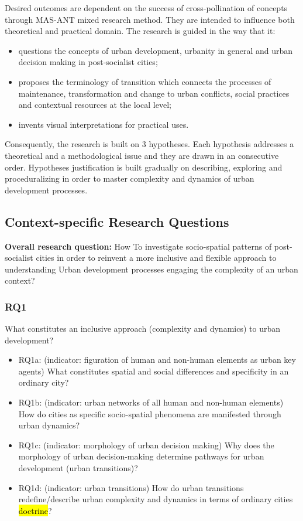 \documentclass[11pt]{report}
\begin{document}
Desired outcomes are dependent on the success of cross-pollination of concepts through MAS-ANT mixed research method. They are intended to influence both theoretical and practical domain. The research is guided in the way that it:
\begin{itemize}
\item questions the concepts of urban development, urbanity in general and urban decision making in post-socialist cities;
\item proposes the terminology of transition which connects the processes of maintenance, transformation and change to urban conflicts, social practices and contextual resources at the local level;
\item invents visual interpretations for practical uses.
\end{itemize}

Consequently, the research is built on 3 hypotheses. Each hypothesis addresses a theoretical and a methodological issue and they are drawn in an consecutive order. Hypotheses justification is built gradually on describing, exploring and proceduralizing in order to master complexity and dynamics of urban development processes. 

\subsection{Context-specific Research Questions}

\textbf{Overall research question:} How To investigate socio-spatial patterns of post-socialist cities in order to reinvent a more inclusive and flexible approach to understanding Urban development processes engaging the complexity of an urban context? 

\subsubsection{RQ1}
What constitutes an inclusive approach (complexity and dynamics) to urban development?
\begin{itemize}
\item RQ1a: (indicator: figuration of human and non-human elements as urban key agents) What constitutes spatial and social differences and specificity in an ordinary city? 
\item RQ1b: (indicator: urban networks of all human and non-human elements) How do cities as specific socio-spatial phenomena are manifested through urban dynamics?
\item RQ1c: (indicator: morphology of urban decision making) Why does the morphology of urban decision-making determine pathways for urban development (urban transitions)?
\item RQ1d: (indicator: urban transitions) How do urban transitions redefine/describe urban complexity and dynamics in terms of ordinary cities \hl{doctrine}?
\end {itemize}
\end{document}
